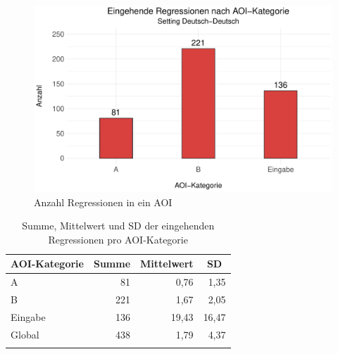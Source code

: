 \begin{figure}
    \includegraphics[width=.85\textwidth]{Figures/EyeTracking/DD/ggplot_regression_DD_IN_AOI_de}
	\caption{Anzahl Regressionen in ein AOI\label{K6:fig:DeDe:RegIn-AOI-Count}}
\end{figure}

\begin{table}
    \begin{tabular}{lrrr} 
    \lsptoprule
        {AOI-Kategorie} & \multicolumn{1}{c}{Summe} & \multicolumn{1}{c}{Mittelwert} & \multicolumn{1}{c}{SD} \\
        \midrule
        A  &  81 & 0,76 & 1,35 \\ 
        B &  221 &  1,67 & 2,05 \\ 
        Eingabe  & 136 & 19,43 & 16,47 \\ 
        \midrule
        Global  & 438 & 1,79 & 4,37 \\ 
        \lspbottomrule
    \end{tabular}
    \caption{Summe, Mittelwert und SD der eingehenden Regressionen pro AOI-Kategorie
             \label{K6:tab:DeDe:mean-sd-regin}}
\end{table}

